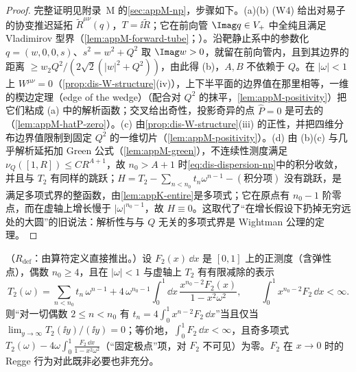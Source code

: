 \begin{proof}
完整证明见附录~M 的\cref{sec:appM-np}，步骤如下。(a)(b) (W4) 给出对易子的协变推迟延拓 $\tilde R^{\mu\nu}(q)$，$T=\ii\tilde R$；它在前向管 $\Imag q\in V_+$ 中全纯且满足 Vladimirov 型界（\cref{lem:appM-forward-tube}；\cite{Streater:1989vi}）。沿靶静止系中的参数化 $q=(w,0,0,s)$、$s^2=w^2+Q^2$ 取 $\Imag w>0$，就留在前向管内，且到其边界的距离 $\ge w_2Q^2/(2\sqrt2(|w|^2+Q^2))$，由此得 (b)，$A,B$ 不依赖于 $Q$。在 $|\omega|<1$ 上 $W^{\mu\nu}=0$（\cref{prop:dis-W-structure}(iv)），上下半平面的边界值在那里相等，一维的楔边定理（edge of the wedge）\cite{Epstein1960}（配合对 $Q^2$ 的抹平，\cref{lem:appM-positivity}）把它们粘成 (a) 中的解析函数；交叉给出奇性，投影奇异的点 $\hat P=0$ 是可去的（\cref{lem:appM-hatP-zero}）。(c) 由\cref{prop:dis-W-structure}(iii) 的正性，并把四维分布边界值限制到固定 $Q^2$ 的一维切片（\cref{lem:appM-positivity}）。(d) 由 (b)(c) 与几乎解析延拓加 Green 公式（\cref{lem:appM-green}），不连续性测度满足 $\nu_Q([1,R])\le CR^{A+1}$，故 $n_0>A+1$ 时\cref{eq:dis-dispersion-np}中的积分收敛，并且与 $T_2$ 有同样的跳跃；$H=T_2-\sum_{n<n_0}t_n\omega^{n-1}-(\text{积分项})$ 没有跳跃，是满足多项式界的整函数，由\cref{lem:appK-entire}是多项式；它在原点有 $n_0-1$ 阶零点，而在虚轴上增长慢于 $|\omega|^{n_0-1}$，故 $H\equiv0$。这取代了“在增长假设下扔掉无穷远处的大圆”的旧说法：解析性与与 $Q$ 无关的多项式界是 Wightman 公理的定理。
\end{proof}

\begin{proposition}\label{prop:dis-low-moments}
（$R_{\mathrm{def}}$：由算符定义直接推出。）设 $F_2(x)\,\dd x$ 是 $[0,1]$ 上的正测度（含弹性点），偶数 $n_0\ge4$，且在 $|\omega|<1$ 与虚轴上 $T_2$ 有有限减除的表示
\begin{equation}\label{eq:dis-low-rep}
T_2(\omega)=\sum_{n<n_0}t_n\,\omega^{n-1}+4\,\omega^{n_0-1}\int_0^1\dd x\,\frac{x^{n_0-2}F_2(x)}{1-x^2\omega^2},\qquad \int_0^1x^{n_0-2}F_2\,\dd x<\infty .
\end{equation}
则“对一切偶数 $2\le n<n_0$ 有 $t_n=4\int_0^1x^{n-2}F_2\,\dd x$”当且仅当 $\lim_{y\to\infty}T_2(\ii y)/(\ii y)=0$；等价地，$\int_0^1F_2\,\dd x<\infty$，且奇多项式 $T_2(\omega)-4\omega\int_0^1\frac{F_2\,\dd x}{1-x^2\omega^2}$（“固定极点”项，对 $F_2$ 不可见）为零。$F_2$ 在 $x\to0$ 时的 Regge 行为对此既非必要也非充分。
\end{proposition}

